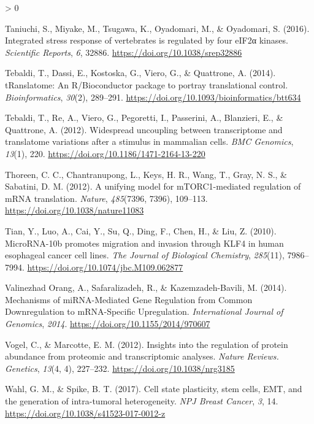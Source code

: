 \documentclass[
  12pt,
  openany]{book}
\newlength{\cslhangindent}
\newenvironment{CSLReferences}[2] %
 {%
  \setlength{\parindent}{0pt}
  \ifodd #1 \everypar{\setlength{\hangindent}{\cslhangindent}}\ignorespaces\fi
  \ifnum #2 > 0
  \setlength{\parskip}{#2\baselineskip}
  \fi
 }%
 {}
\begin{document}
\begin{CSLReferences}{1}{0}
\leavevmode\hypertarget{ref-Taniuchi2016}{}%
Taniuchi, S., Miyake, M., Tsugawa, K., Oyadomari, M., \& Oyadomari, S. (2016). Integrated stress response of vertebrates is regulated by four {eIF2α} kinases. \emph{Scientific Reports}, \emph{6}, 32886. \url{https://doi.org/10.1038/srep32886}

\leavevmode\hypertarget{ref-Tebaldi2014}{}%
Tebaldi, T., Dassi, E., Kostoska, G., Viero, G., \& Quattrone, A. (2014). {tRanslatome}: An {R}/{Bioconductor} package to portray translational control. \emph{Bioinformatics}, \emph{30}(2), 289--291. \url{https://doi.org/10.1093/bioinformatics/btt634}

\leavevmode\hypertarget{ref-Tebaldi2012}{}%
Tebaldi, T., Re, A., Viero, G., Pegoretti, I., Passerini, A., Blanzieri, E., \& Quattrone, A. (2012). Widespread uncoupling between transcriptome and translatome variations after a stimulus in mammalian cells. \emph{BMC Genomics}, \emph{13}(1), 220. \url{https://doi.org/10.1186/1471-2164-13-220}

\leavevmode\hypertarget{ref-Thoreen2012}{}%
Thoreen, C. C., Chantranupong, L., Keys, H. R., Wang, T., Gray, N. S., \& Sabatini, D. M. (2012). A unifying model for {mTORC1}-mediated regulation of {mRNA} translation. \emph{Nature}, \emph{485}(7396, 7396), 109--113. \url{https://doi.org/10.1038/nature11083}

\leavevmode\hypertarget{ref-Tian2010}{}%
Tian, Y., Luo, A., Cai, Y., Su, Q., Ding, F., Chen, H., \& Liu, Z. (2010). {MicroRNA}-10b promotes migration and invasion through {KLF4} in human esophageal cancer cell lines. \emph{The Journal of Biological Chemistry}, \emph{285}(11), 7986--7994. \url{https://doi.org/10.1074/jbc.M109.062877}

\leavevmode\hypertarget{ref-ValinezhadOrang2014}{}%
Valinezhad Orang, A., Safaralizadeh, R., \& Kazemzadeh-Bavili, M. (2014). Mechanisms of {miRNA}-{Mediated Gene Regulation} from {Common Downregulation} to {mRNA}-{Specific Upregulation}. \emph{International Journal of Genomics}, \emph{2014}. \url{https://doi.org/10.1155/2014/970607}

\leavevmode\hypertarget{ref-Vogel2012}{}%
Vogel, C., \& Marcotte, E. M. (2012). Insights into the regulation of protein abundance from proteomic and transcriptomic analyses. \emph{Nature Reviews. Genetics}, \emph{13}(4, 4), 227--232. \url{https://doi.org/10.1038/nrg3185}

\leavevmode\hypertarget{ref-Wahl2017}{}%
Wahl, G. M., \& Spike, B. T. (2017). Cell state plasticity, stem cells, {EMT}, and the generation of intra-tumoral heterogeneity. \emph{NPJ Breast Cancer}, \emph{3}, 14. \url{https://doi.org/10.1038/s41523-017-0012-z}


\end{CSLReferences}
\end{document}
